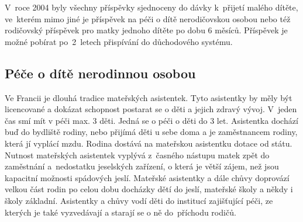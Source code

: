 				V roce 2004 byly všechny příspěvky sjednoceny do dávky k přijetí malého dítěte, ve kterém mimo jiné je příspěvek na péči o dítě nerodičovskou osobou nebo též rodičovský příspěvek pro matky jednoho dítěte po dobu 6 měsíců. Příspěvek je možné pobírat po 2 letech přispívání do důchodového systému. \citep{Dennipece}

			\subsection{Péče o dítě nerodinnou osobou}
				Ve Francii je dlouhá tradice mateřských asistentek. Tyto asistentky by měly být licencované a dokázat schopnost postarat se o děti a jejich zdravý vývoj. V jeden čas smí mít v péči max. 3 děti. Jedná se o péči o děti do 3 let. Asistentka dochází buď do bydliště rodiny, nebo přijímá děti u sebe doma a je zaměstnancem rodiny, která jí vyplácí mzdu. Rodina dostává na mateřskou asistentku dotace od státu.
				Nutnost mateřských asistentek vyplývá z časného nástupu matek zpět do zaměstnání a nedostatku jeselských zařízení, o která je větší zájem, než jsou kapacitní možnosti spádových jeslí. Mateřské asistentky a dále chůvy doprovází velkou část rodin po celou dobu docházky dětí do jeslí, mateřské školy a někdy i školy základní. Asistentky a chůvy vodí děti do institucí zajišťující péči, ze kterých je také vyzvedávají a starají se o ně do příchodu rodičů.
